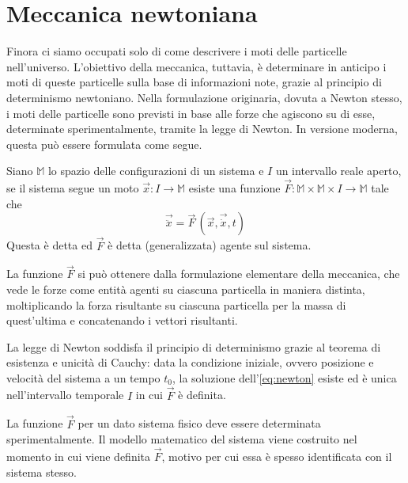 \section{Meccanica newtoniana}
Finora ci siamo occupati solo di come descrivere i moti delle particelle nell'universo. L'obiettivo della meccanica, tuttavia, è determinare in anticipo i moti di queste particelle sulla base di informazioni note, grazie al principio di determinismo newtoniano. Nella formulazione originaria, dovuta a Newton stesso, i moti delle particelle sono previsti in base alle forze che agiscono su di esse, determinate sperimentalmente, tramite la legge di Newton. In versione moderna, questa può essere formulata come segue.
\begin{newton}
  Siano $\mathbb{M}$ lo spazio delle configurazioni di un sistema e $I$ un intervallo reale aperto, se il sistema segue un moto $\vec{x}:I \to \mathbb{M}$ esiste una funzione $\vec{F}:\mathbb{M} \times \mathbb{M} \times  I \to \mathbb{M}$ tale che \begin{equation}
  \vec{\ddot{x}} = \vec{F}\,(\vec{x},\vec{\dot{x}}, t) \label{eq:newton}
  \end{equation} 
  Questa è detta  ed $\vec{F}$ è detta  (generalizzata) agente sul sistema.
\end{newton}
\begin{remark}
  La funzione $\vec{F}$ si può ottenere dalla formulazione elementare della meccanica, che vede le forze come entità agenti su ciascuna particella in maniera distinta, moltiplicando la forza risultante su ciascuna particella per la massa di quest'ultima e concatenando i vettori risultanti.
\end{remark}
\begin{remark}
  La legge di Newton soddisfa il principio di determinismo grazie al teorema di esistenza e unicità di Cauchy: data la condizione iniziale, ovvero posizione e velocità del sistema a un tempo $t_0$, la soluzione dell'\autoref{eq:newton} esiste ed è unica nell'intervallo temporale $I$ in cui $\vec{F}$ è definita.
\end{remark}
La funzione $\vec{F}$ per un dato sistema fisico deve essere determinata sperimentalmente. Il modello matematico del sistema viene costruito nel momento in cui viene definita $\vec{F}$, motivo per cui essa è spesso identificata con il sistema stesso.

